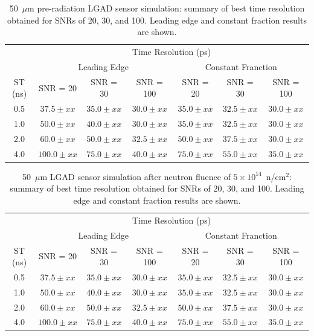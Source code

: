 \documentclass[preprint,1p]{elsarticle}
\begin{document}
\begin{table}\label{tab:shaping_time_prerad}
    \begin{tabular}{c|ccc|ccc}
    \multicolumn{1}{c}{}& \multicolumn{6}{c}{Time Resolution (ps)} \\
    \multicolumn{1}{c}{}&\multicolumn{3}{c}{Leading Edge} & \multicolumn{3}{c}{Constant Franction}\\ \hline
    ST (ns) & SNR = 20   & SNR = 30      & SNR = 100     & SNR = 20      & SNR = 30      & SNR = 100 \\
    0.5 & $37.5 \pm xx$  & $35.0 \pm xx$ & $30.0 \pm xx$ & $35.0 \pm xx$ & $32.5 \pm xx$ & $30.0 \pm xx$\\
    1.0 & $50.0 \pm xx$  & $40.0 \pm xx$ & $30.0 \pm xx$ & $35.0 \pm xx$ & $32.5 \pm xx$ & $30.0 \pm xx$\\
    2.0 & $60.0 \pm xx$  & $50.0 \pm xx$ & $32.5 \pm xx$ & $50.0 \pm xx$ & $37.5 \pm xx$ & $30.0 \pm xx$\\
    4.0 & $100.0 \pm xx$ & $75.0 \pm xx$ & $40.0 \pm xx$ & $75.0 \pm xx$ & $55.0 \pm xx$ & $35.0 \pm xx$\\
    \end{tabular}
    \caption{50~$\mu$m pre-radiation LGAD sensor simulation: summary of best time resolution obtained for SNRs
    of 20, 30, and 100. Leading edge and constant fraction results are shown.}
 \end{table}

 \begin{table}\label{tab:shaping_time_5e14}
     \begin{tabular}{c|ccc|ccc}
     \multicolumn{1}{c}{}& \multicolumn{6}{c}{Time Resolution (ps)} \\
     \multicolumn{1}{c}{}&\multicolumn{3}{c}{Leading Edge} & \multicolumn{3}{c}{Constant Franction}\\ \hline
     ST (ns) & SNR = 20   & SNR = 30      & SNR = 100     & SNR = 20      & SNR = 30      & SNR = 100 \\
     0.5 & $37.5 \pm xx$  & $35.0 \pm xx$ & $30.0 \pm xx$ & $35.0 \pm xx$ & $32.5 \pm xx$ & $30.0 \pm xx$\\
     1.0 & $50.0 \pm xx$  & $40.0 \pm xx$ & $30.0 \pm xx$ & $35.0 \pm xx$ & $32.5 \pm xx$ & $30.0 \pm xx$\\
     2.0 & $60.0 \pm xx$  & $50.0 \pm xx$ & $32.5 \pm xx$ & $50.0 \pm xx$ & $37.5 \pm xx$ & $30.0 \pm xx$\\
     4.0 & $100.0 \pm xx$ & $75.0 \pm xx$ & $40.0 \pm xx$ & $75.0 \pm xx$ & $55.0 \pm xx$ & $35.0 \pm xx$\\
     \end{tabular}
     \caption{50~$\mu$m LGAD sensor simulation after neutron fluence of
      $5\times 10^{14}$~n/cm$^2$: summary of best time resolution obtained for SNRs
     of 20, 30, and 100. Leading edge and constant fraction results are shown.}
  \end{table}
\end{document}
